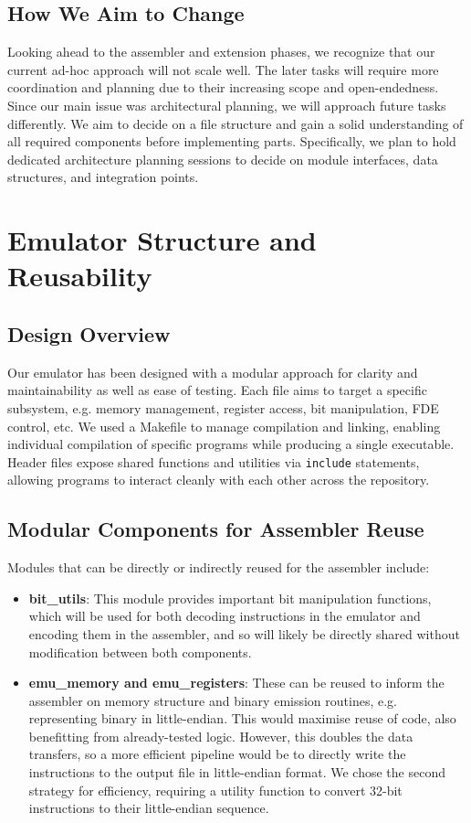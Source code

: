 \documentclass[9.5pt]{article}
\begin{document}
\subsection{How We Aim to Change}
\noindent Looking ahead to the assembler and extension phases, we recognize that our current ad-hoc approach will not scale well. The later tasks will require more coordination and planning due to their increasing scope and open-endedness. \newline
\noindent Since our main issue was architectural planning, we will approach future tasks differently. We aim to decide on a file structure and gain a solid understanding of all required components before implementing parts. Specifically, we plan to hold dedicated architecture planning sessions to decide on module interfaces, data structures, and integration points.

\section{Emulator Structure and Reusability}
\subsection{Design Overview}
Our emulator has been designed with a modular approach for clarity and maintainability as well as ease of testing.
Each file aims to target a specific subsystem, e.g. memory management, register access, bit manipulation, FDE control, etc. We used a Makefile to manage compilation and linking, enabling individual compilation of specific programs while producing a single executable. Header files expose shared functions and utilities via \texttt{include} statements, allowing programs to interact cleanly with each other across the repository.
\subsection{Modular Components for Assembler Reuse}
Modules that can be directly or indirectly reused for the assembler include:
\begin{itemize}[leftmargin=1.5em, itemsep=0pt]
    \item \textbf{bit\_utils}: This module provides important bit manipulation functions, which will be used for both decoding instructions in the emulator and encoding them in the assembler, and so will likely be directly shared without modification between both components.
    \item \textbf{emu\_memory and emu\_registers}: These can be reused to inform the assembler on memory structure and binary emission routines, e.g. representing binary in little-endian. This would maximise reuse of code, also benefitting from already-tested logic. However, this doubles the data transfers, so a more efficient pipeline would be to directly write the instructions to the output file in little-endian format. We chose the second strategy for efficiency, requiring a utility function to convert 32-bit instructions to their little-endian sequence.
\end{itemize}
\end{document}
